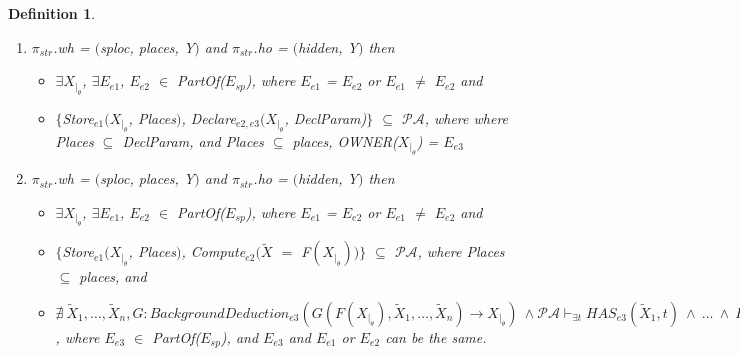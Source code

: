 \documentclass[a4paper]{article}
\newtheorem{ttd}{Definition}
\begin{document}
\begin{ttd}
\begin{enumerate}
\begin{enumerate}
\begin{itemize}
\item $\exists\ \tilde{X}_1, \dots, \tilde{X}_n, G: BackgroundDeduction_{e3}(G(F(X_{|_{\theta}}), \tilde{X}_1, \dots, \tilde{X}_n) \rightarrow X_{|_{\theta}})\ \wedge 
\mathcal{P}\mathcal{A} \vdash_{\exists t} \textit{HAS}_{e3}\left(\tilde{X}_1, t\right)\ \wedge \ \dots \ \wedge\ \textit{HAS}_{e3}\left(\tilde{X}_n, t\right)$, where $E_{e3}$ $\in$ \textit{PartOf}($E_{sp}$), and $E_{e3}$ and $E_{e1}$ or $E_{e2}$ can be the same.

\end{itemize} 

\item $\pi_{str}$.\textit{wh} = $($\textit{sploc}, \textit{places}, Y$)$ and $\pi_{str}$.\textit{ho} = $($\textit{hidden}, Y$)$ then \begin{itemize} 
\item $\exists$$X_{|_{\theta}}$, $\exists$$E_{e1}$, $E_{e2}$ $\in$ \textit{PartOf}($E_{sp}$), where $E_{e1}$ = $E_{e2}$ or $E_{e1}$ $\neq$ $E_{e2}$ and 

\item $\{$\textit{Store}$_{e1}$$(X_{|_{\theta}}$, \textit{Places}$)$,  \textit{Declare}$_{e2,e3}$$(X_{|_{\theta}}$, \textit{DeclParam})$\}$ $\subseteq$ $\mathcal{P}\mathcal{A}$,  where where \textit{Places} $\subseteq$ \textit{DeclParam}, and \textit{Places} $\subseteq$ \textit{places}, OWNER($X_{|_{\theta}}$) = $E_{e3}$
\end{itemize}

\item $\pi_{str}$.\textit{wh} = $($\textit{sploc}, \textit{places}, Y$)$ and $\pi_{str}$.\textit{ho} = $($\textit{hidden}, Y$)$ then \begin{itemize} 
\item $\exists$$X_{|_{\theta}}$, $\exists$$E_{e1}$, $E_{e2}$ $\in$ \textit{PartOf}($E_{sp}$), where $E_{e1}$ = $E_{e2}$ or $E_{e1}$ $\neq$ $E_{e2}$ and 

\item $\{$\textit{Store}$_{e1}$$(X_{|_{\theta}}$, \textit{Places}$)$, \textit{Compute}$_{e2}$$($$\tilde{X}$ $=$ F$(X_{|_{\theta}})$$)$$\}$ $\subseteq$ $\mathcal{P}\mathcal{A}$,  where \textit{Places} $\subseteq$ \textit{places}, and 

\item $\nexists\ \tilde{X}_1, \dots, \tilde{X}_n, G: BackgroundDeduction_{e3}(G(F(X_{|_{\theta}}), \tilde{X}_1, \dots, \tilde{X}_n) \rightarrow X_{|_{\theta}})\ \wedge 
\mathcal{P}\mathcal{A} \vdash_{\exists t} \textit{HAS}_{e3}\left(\tilde{X}_1, t\right)\ \wedge \ \dots \ \wedge\ \textit{HAS}_{e3}\left(\tilde{X}_n, t\right)$, where $E_{e3}$ $\in$ \textit{PartOf}($E_{sp}$), and $E_{e3}$ and $E_{e1}$ or $E_{e2}$ can be the same.


\end{itemize}
\end{enumerate}
\end{enumerate}
\end{ttd}
\end{document}
